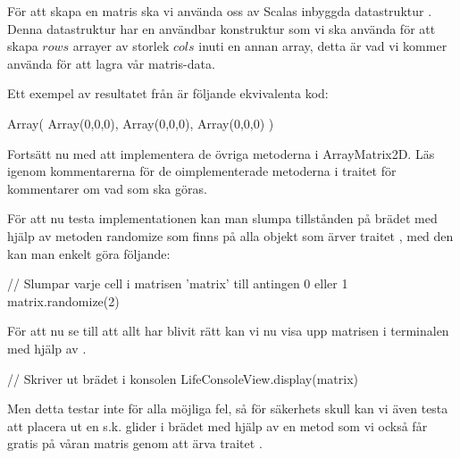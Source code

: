 
        För att skapa en matris ska vi använda oss av Scalas inbyggda datastruktur . Denna datastruktur har en användbar konstruktur  som vi ska använda för att skapa $rows$ arrayer av storlek $cols$ inuti en annan array, detta är vad vi kommer använda för att lagra vår matris-data.
        
        Ett exempel av resultatet från  är följande ekvivalenta kod:

\begin{Code}
Array(
	Array(0,0,0),
	Array(0,0,0),
	Array(0,0,0)	
)
\end{Code}




		Fortsätt nu med att implementera de övriga metoderna i ArrayMatrix2D. Läs igenom kommentarerna för de oimplementerade metoderna i traitet  för kommentarer om vad som ska göras.
		


        För att nu testa implementationen kan man slumpa tillstånden på brädet med hjälp av metoden randomize som finns på alla objekt som ärver traitet , med den kan man enkelt göra följande:

\begin{Code}
// Slumpar varje cell i matrisen 'matrix' till antingen 0 eller 1
matrix.randomize(2)
\end{Code}

        För att nu se till att allt har blivit rätt kan vi nu visa upp matrisen i terminalen med hjälp av .

\begin{Code}
// Skriver ut brädet i konsolen
LifeConsoleView.display(matrix)
\end{Code}

        Men detta testar inte för alla möjliga fel, så för säkerhets skull kan vi även testa att placera ut en s.k. glider i brädet med hjälp av en metod  som vi också får gratis på våran matris genom att ärva traitet .

